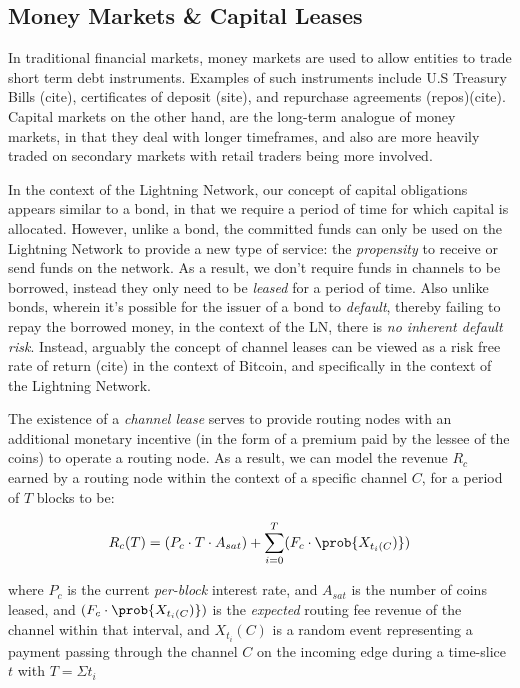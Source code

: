 \documentclass[10pt,a4paper]{article}
\theoremstyle{definition}
\begin{document}

\subsection{Money Markets \& Capital Leases} %

In traditional financial markets, money markets are used to allow entities to
trade short term debt instruments. Examples of such instruments include U.S
Treasury Bills (cite), certificates of deposit (site), and repurchase
agreements (repos)(cite). Capital markets on the other hand, are the long-term
analogue of money markets, in that they deal with longer timeframes, and also
are more heavily traded on secondary markets with retail traders being more
involved.

In the context of the Lightning Network, our concept of capital obligations
appears similar to a bond, in that we require a period of time for
which capital is allocated. However, unlike a bond, the committed funds
can only be used on the Lightning Network to provide a new type of service: the
\emph{propensity} to receive or send funds on the network. As a result, we
don't require funds in channels to be borrowed, instead they only need to be
\emph{leased} for a period of time. Also unlike bonds, wherein it's possible for
the issuer of a bond to \emph{default}, thereby failing to repay the borrowed
money, in the context of the LN, there is \emph{no inherent default risk}.
Instead, arguably the concept of channel leases can be viewed as a risk free
rate of return (cite) in the context of Bitcoin, and specifically in the context of the
Lightning Network. 

The existence of a \emph{channel lease} serves to provide routing nodes with an
additional monetary incentive (in the form of a premium paid by the lessee of
the coins) to operate a routing node. As a result, we can model the revenue
$R_c$ earned by a routing node within the context of a specific channel $C$,
for a period of $T$ blocks to be: 

\begin{equation}
    R_c(T) = (P_c \cdot T \cdot A_{sat}) + \sum_{i=0}^T (F_c \cdot \prob{X_{t_i(C})})
\end{equation}

where $P_c$ is the current \emph{per-block} interest rate, and $A_{sat}$ is the
number of coins leased, and $(F_c \cdot \prob{X_{t_i(C})})$ is the
\emph{expected} routing fee revenue of the channel within that interval, and
$X_{t_i}(C)$ is a random event representing a payment passing through the
channel $C$ on the incoming edge during a time-slice $t$ with $T = \Sigma t_i$ \\
\end{document}
